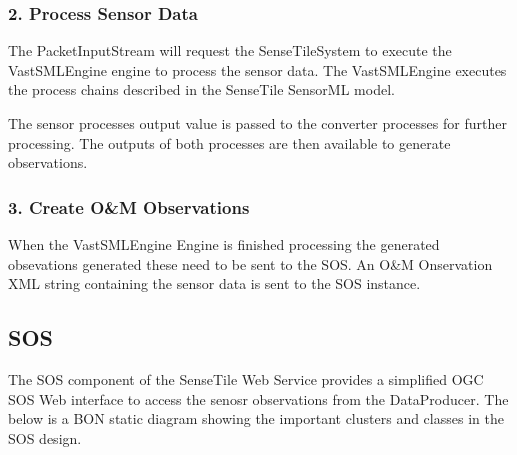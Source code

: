 \documentclass[]{final_report}
\begin{document}
\subsubsection {2. Process Sensor Data}
The PacketInputStream will request the SenseTileSystem to execute
the VastSMLEngine engine to process the sensor data. The VastSMLEngine
executes the process chains described in the SenseTile SensorML model.

The sensor processes output value is passed to the converter processes for further processing. The
outputs of both processes are then available to generate observations.

\subsubsection {3. Create O\&M Observations}

When the VastSMLEngine Engine is finished processing
the generated obsevations generated these
need to be sent to the SOS. An O\&M Onservation
XML string containing the sensor data is sent to
the SOS instance.


\newpage
\subsection {SOS}

The SOS component of the SenseTile Web Service provides a simplified OGC SOS Web interface to access the senosr observations from the DataProducer. The below is a BON static diagram showing the important clusters and classes in the SOS design.
\end{document}
